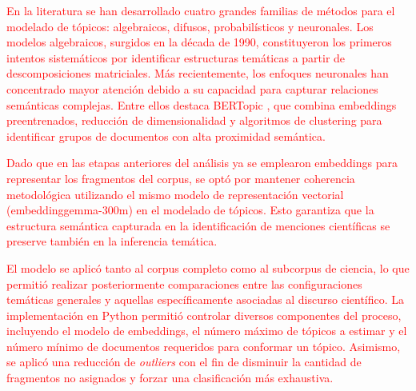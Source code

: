 \documentclass[11pt,a4paper]{article}
\begin{document}
	\textcolor{red}{En la literatura se han desarrollado cuatro grandes familias de métodos para el modelado de tópicos: algebraicos, difusos, probabilísticos y neuronales. Los modelos algebraicos, surgidos en la década de 1990, constituyeron los primeros intentos sistemáticos por identificar estructuras temáticas a partir de descomposiciones matriciales. Más recientemente, los enfoques neuronales han concentrado mayor atención debido a su capacidad para capturar relaciones semánticas complejas. Entre ellos destaca BERTopic \cite{Grootendorst2022}, que combina embeddings preentrenados, reducción de dimensionalidad y algoritmos de clustering para identificar grupos de documentos con alta proximidad semántica.}
	
	\textcolor{red}{Dado que en las etapas anteriores del análisis ya se emplearon embeddings para representar los fragmentos del corpus, se optó por mantener coherencia metodológica utilizando el mismo modelo de representación vectorial (embeddinggemma-300m) en el modelado de tópicos. Esto garantiza que la estructura semántica capturada en la identificación de menciones científicas se preserve también en la inferencia temática.}
	
	\textcolor{red}{El modelo se aplicó tanto al corpus completo como al subcorpus de ciencia, lo que permitió realizar posteriormente comparaciones entre las configuraciones temáticas generales y aquellas específicamente asociadas al discurso científico. La implementación en Python permitió controlar diversos componentes del proceso, incluyendo el modelo de embeddings, el número máximo de tópicos a estimar y el número mínimo de documentos requeridos para conformar un tópico. Asimismo, se aplicó una reducción de \emph{outliers} con el fin de disminuir la cantidad de fragmentos no asignados y forzar una clasificación más exhaustiva.}
	
\end{document}
